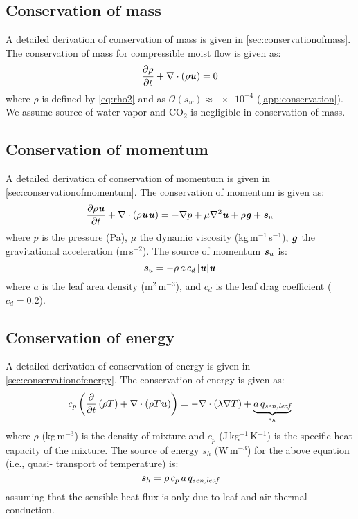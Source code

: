 \subsection*{Conservation of mass}

A detailed derivation of conservation of mass is given in \cref{sec:conservationofmass}. The conservation of mass for compressible moist flow is given as:
\begin{equation}
\frac{\partial \rho}{\partial t} + \nabla \cdot \left( \rho \textbf{\textit{u}} \right) = 0
\end{equation}
where $\rho$ is defined by \cref{eq:rho2} and as $\mathcal{O}(s_w)\approx \num{e-4}$ (\cref{app:conservation}). We assume source of water vapor and CO$_2$ is negligible in conservation of mass. 

\subsection*{Conservation of momentum}

A detailed derivation of conservation of momentum is given in \cref{sec:conservationofmomentum}. The conservation of momentum is given as:
\begin{equation}
\frac{\partial \rho \textbf{\textit{u}}}{\partial t} + \nabla  \cdot \left( \rho \textbf{\textit{u}} \textbf{\textit{u}} \right) = -\nabla p + \mu \nabla^2 \textbf{\textit{u}} + \rho \textbf{\textit{g}} + \textbf{\textit{s}}_u
\end{equation}
where $p$ is the pressure (Pa), $\mu$ the dynamic viscosity (kg\,m$^{-1}$\,s$^{-1}$), $\textbf{\textit{g}}$ the gravitational acceleration (m\,s$^{-2}$). The source of momentum $\textbf{\textit{s}}_u$ is:
\begin{equation}
\textbf{\textit{s}}_u = - \rho\, a \,c_d \,|\textbf{\textit{u}}|\textbf{\textit{u}}
\end{equation}
where $a$ is the leaf area density (m$^2$\,m$^{-3}$), and $c_d$ is the leaf drag coefficient ($c_d = 0.2$).


\subsection*{Conservation of energy}

A detailed derivation of conservation of energy is given in \cref{sec:conservationofenergy}. The conservation of energy is given as:
\begin{equation}
c_p  \left( \frac{\partial }{\partial t} \left( \rho T \right) + \nabla \cdot \left(\rho T \textbf{\textit{u}} \right)  \right) = - \nabla  \cdot \left(\lambda \nabla T \right) + \underbrace{a\,q_{\textit{sen,leaf}}}_{s_h}
\end{equation}
where $\rho$ (kg\,m$^{-3}$) is the density of mixture and $c_p$ (J\,kg$^{-1}$\,K$^{-1}$) is the specific heat capacity of the mixture. The source of energy $s_h$ (W\,m$^{-3}$) for the above equation (i.e., quasi- transport of temperature) is:
\begin{equation}
\textbf{\textit{s}}_h = \rho\,c_p\, a\, q_{\textit{sen,leaf}}
\label{eq:sh}
\end{equation}
assuming that the sensible heat flux is only due to leaf and air thermal conduction. 


